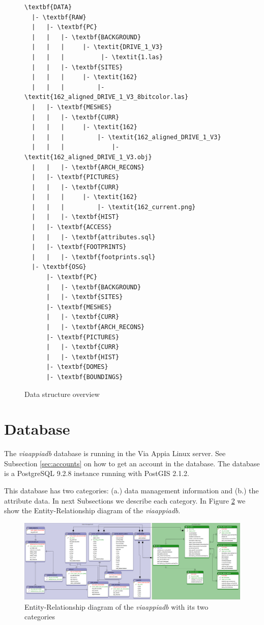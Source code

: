 \documentclass[a4paper,11pt]{article}
\begin{document}
\begin{figure}
\begin{Verbatim}[fontfamily=courier,commandchars=\\\{\},fontsize=\footnotesize, frame=lines]
\textbf{DATA}
  |- \textbf{RAW}                  
  |   |- \textbf{PC}
  |   |   |- \textbf{BACKGROUND}
  |   |   |     |- \textit{DRIVE_1_V3}
  |   |   |          |- \textit{1.las}
  |   |   |- \textbf{SITES}
  |   |   |     |- \textit{162}
  |   |   |         |- \textit{162_aligned_DRIVE_1_V3_8bitcolor.las}
  |   |- \textbf{MESHES}
  |   |   |- \textbf{CURR}
  |   |   |     |- \textit{162}
  |   |   |         |- \textit{162_aligned_DRIVE_1_V3}
  |   |   |             |- \textit{162_aligned_DRIVE_1_V3.obj}
  |   |   |- \textbf{ARCH_RECONS}
  |   |- \textbf{PICTURES}
  |   |   |- \textbf{CURR}
  |   |   |     |- \textit{162}
  |   |   |         |- \textit{162_current.png}
  |   |   |- \textbf{HIST}
  |   |- \textbf{ACCESS}
  |   |   |- \textbf{attributes.sql}
  |   |- \textbf{FOOTPRINTS}
  |   |   |- \textbf{footprints.sql}
  |- \textbf{OSG}                  
      |- \textbf{PC}
      |   |- \textbf{BACKGROUND}
      |   |- \textbf{SITES}
      |- \textbf{MESHES}
      |   |- \textbf{CURR}
      |   |- \textbf{ARCH_RECONS}
      |- \textbf{PICTURES}
      |   |- \textbf{CURR}
      |   |- \textbf{HIST}
      |- \textbf{DOMES}
      |- \textbf{BOUNDINGS}
\end{Verbatim}
\caption{Data structure overview}
\label{fig:dataover}
\end{figure}

\newpage

\section{Database}
\label{sec:db}

The \textit{viaappiadb} database is running in the Via Appia Linux server. See Subsection \ref{sec:accounts} on how to get an account in the database. The database is a PostgreSQL 9.2.8 instance running with PostGIS 2.1.2.

This database has two categories: (a.) data management information and (b.) the attribute data. In next Subsections we describe each category. In Figure
\ref{fig:erviaappiadb} we show the Entity-Relationship diagram of the \textit{viaappiadb}.

\begin{figure}[!ht]
\centering
\includegraphics[width=\textwidth]{fig/ERDB}
\caption{Entity-Relationship diagram of the \textit{viaappiadb} with its two categories}
\label{fig:erviaappiadb}
\end{figure}
\end{document}
